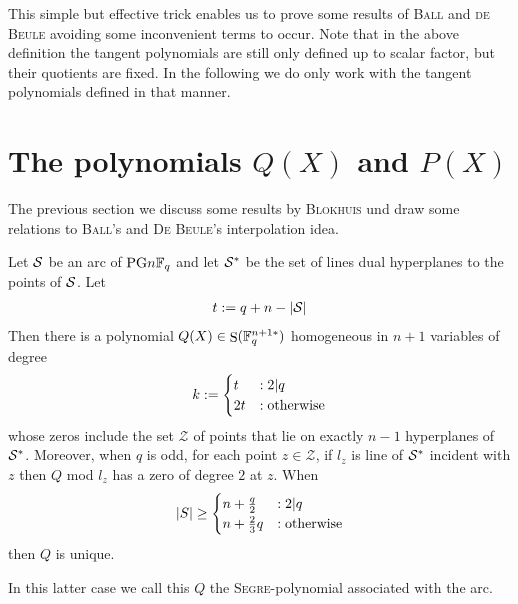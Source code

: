 \documentclass[a4paper]{article}
\begin{document}
\begin{remark}
  This simple but effective trick enables us to prove some results of \textsc{Ball} and \textsc{de Beule} avoiding some inconvenient terms to occur.
  Note that in the above definition the tangent polynomials are still only defined up to scalar factor, but their quotients are fixed.
  In the following we do only work with the tangent polynomials defined in that manner.
\end{remark}

\section{The polynomials $Q(X)$ and $P(X)$}

The previous section we discuss some results by \textsc{Blokhuis} und draw some relations to \textsc{Ball}'s and \textsc{De Beule}'s interpolation idea.

\begin{lemma}[Blokhuis]
  Let $\mathcal{S}$ be an arc of $\mathrm{PG}{n}{\mathbb{F}_{q}}$ and let $\mathcal{S}^*$ be the set of lines dual hyperplanes
  to the points of $\mathcal{S}$. Let
  \begin{align*}
    t:=q+n-\mathcal{\left|S\right|}
  \end{align*}
  Then there is a polynomial $Q(X)\in\mathop\mathrm{S}(\mathbb{F}_{q}^{{n+1}*})$ homogeneous in $n+1$ variables of degree 
  \begin{equation}
    k:=\begin{cases}
      t &: 2|q\\
     2t &: \textrm{otherwise} 
       \end{cases}
  \end{equation}
  whose zeros include the set $\mathcal{Z}$ of points that lie on exactly $n-1$ hyperplanes of $\mathcal{S}^*$.
  Moreover, when $q$ is odd, for each point $z\in \mathcal{Z}$, if $l_z$ is line of $\mathcal{S}^*$ incident with $z$ then $Q$ mod $l_z$ has a zero of degree $2$ at $z$.
  When 
  \begin{equation}
    \left|S\right|\geq \begin{cases}
      n+\frac{q}{2} &: 2|q \\
      n+\frac{2}{3}q &: \textrm{otherwise}
  \end{cases}
  \end{equation}
  then $Q$ is unique.
\end{lemma}

In this latter case we call this $Q$ the \textsc{Segre}-polynomial associated with the arc.
\end{document}
